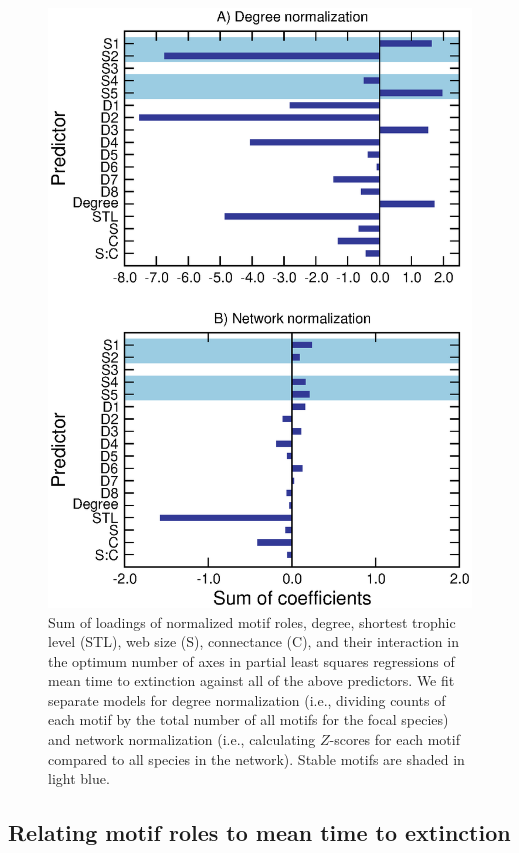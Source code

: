 \documentclass[12pt]{article}
\begin{document}
		\begin{figure}[h!]
			\caption{Sum of loadings of normalized motif roles, degree, shortest trophic level (STL), web size (S), connectance (C), and their interaction in the optimum number of axes in partial least squares regressions of mean time to extinction against all of the above predictors. We fit separate models for degree normalization (i.e., dividing counts of each motif by the total number of all motifs for the focal species) and network normalization (i.e., calculating $Z$-scores for each motif compared to all species in the network). Stable motifs are shaded in light blue.}
			\label{coefficient_sum}
			\includegraphics[height=0.75\textheight]{figures/PLS/total_coefficients.eps}

			\end{figure}


	\subsection*{Relating motif roles to mean time to extinction} 
\end{document}
